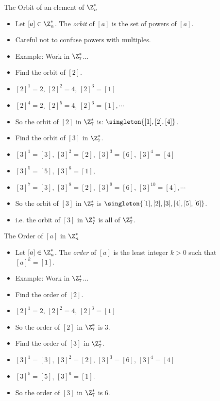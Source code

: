\documentclass[handout]{beamer}
\begin{document}
\begin{frame}{The Orbit of an element of $\Z_n^*$}

\begin{itemize}
  \item Let $[a]\in\Z^*_n$. The \emph{orbit} of $[a]$ is
  the set of powers of $[a]$.
  \item Careful not to confuse powers with multiples.
  \item Example: Work in $\Z^*_7$...
  \item Find the orbit of $[2]$.
  \item $[2]^1 = 2$, $[2]^2 = 4$, $[2]^3=[1]$
  \item $[2]^4 = 2$, $[2]^5 = 4$, $[2]^6=[1], \cdots$
  \item So the orbit of $[2]$ in $\Z^*_7$ is: $\singleton{[1],[2],[4]}$.
  \item Find the orbit of $[3]$ in $\Z^*_7$.
  \item $[3]^1=[3]$, $[3]^2=[2]$, $[3]^3=[6]$, $[3]^4=[4]$
  \item $[3]^5=[5]$, $[3]^6=[1]$,
  \item $[3]^7=[3]$, $[3]^8=[2]$, $[3]^9=[6]$, $[3]^{10}=[4],\cdots$
  \item So the orbit of $[3]$ in $\Z^*_7$ is $\singleton{[1],[2],[3],[4],[5],[6]}$.
  \item i.e. the orbit of $[3]$ in $\Z^*_7$ is all of $\Z^*_7$.
\end{itemize}

\end{frame}

\begin{frame}{The Order of $[a]$ in $\Z_n^*$}

\begin{itemize}
  \item Let $[a]\in\Z^*_n$. The \emph{order} of $[a]$ is
  the least integer $k>0$ such that $[a]^k=[1]$.
  \item Example: Work in $\Z^*_7$...
  \item Find the order of $[2]$.
  \item $[2]^1 = 2$, $[2]^2 = 4$, $[2]^3=[1]$
  \item So the order of $[2]$ in $\Z^*_7$ is 3.
  \item Find the order of $[3]$ in $\Z^*_7$.
  \item $[3]^1=[3]$, $[3]^2=[2]$, $[3]^3=[6]$, $[3]^4=[4]$
  \item $[3]^5=[5]$, $[3]^6=[1]$.
  \item So the order of $[3]$ in $\Z^*_7$ is 6.
\end{itemize}

\end{frame}
\end{document}
